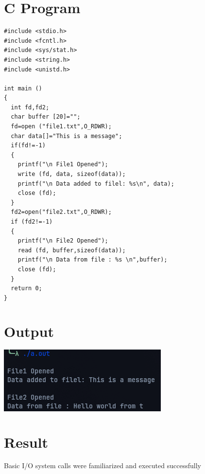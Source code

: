 \section{C Program}
\begin{lstlisting}[label={list:c_program:queue}]
#include <stdio.h>
#include <fcntl.h>
#include <sys/stat.h>
#include <string.h>
#include <unistd.h>

int main ()
{
  int fd,fd2;
  char buffer [20]="";
  fd=open ("file1.txt",O_RDWR);
  char data[]="This is a message";
  if(fd!=-1)
  {
    printf("\n File1 Opened");
    write (fd, data, sizeof(data));
    printf("\n Data added to filel: %s\n", data);
    close (fd);
  }
  fd2=open("file2.txt",O_RDWR);
  if (fd2!=-1)
  {
    printf("\n File2 Opened");
    read (fd, buffer,sizeof(data));
    printf("\n Data from file : %s \n",buffer);
    close (fd);
  }
  return 0;
}
\end{lstlisting}

\section{Output}
\includegraphics[width=0.75\linewidth]{Cycle_1//Outputs/fileio.png}

\section{Result}
Basic I/O system calls were familiarized and executed successfully